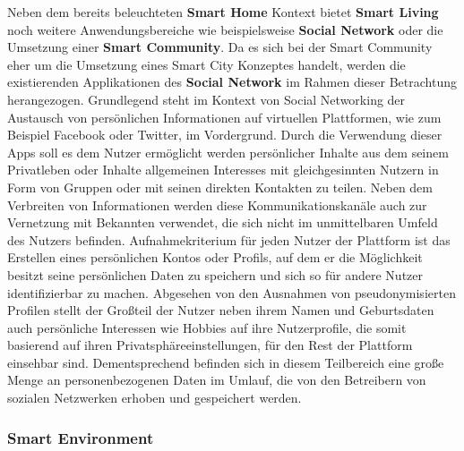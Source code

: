 Neben dem bereits beleuchteten \textbf{Smart Home} Kontext bietet \textbf{Smart Living} noch weitere Anwendungsbereiche wie beispielsweise \textbf{Social Network} oder die Umsetzung einer \textbf{Smart Community}. 
Da es sich bei der Smart Community eher um die Umsetzung eines Smart City Konzeptes handelt, werden die existierenden Applikationen des \textbf{Social Network} im Rahmen dieser Betrachtung herangezogen. Grundlegend steht im Kontext von Social Networking der Austausch von persönlichen Informationen auf virtuellen Plattformen, wie zum Beispiel Facebook oder Twitter, im Vordergrund. 
Durch die Verwendung dieser Apps soll es dem Nutzer ermöglicht werden persönlicher Inhalte aus dem seinem Privatleben oder Inhalte allgemeinen Interesses mit gleichgesinnten Nutzern in Form von Gruppen oder mit seinen direkten Kontakten zu teilen. Neben dem Verbreiten von Informationen werden diese Kommunikationskanäle auch zur Vernetzung mit Bekannten verwendet, die sich nicht im unmittelbaren Umfeld des Nutzers befinden. 
Aufnahmekriterium für jeden Nutzer der Plattform ist das Erstellen eines persönlichen Kontos oder Profils, auf dem er die Möglichkeit besitzt seine persönlichen Daten zu speichern und sich so für andere Nutzer identifizierbar zu machen. 
Abgesehen von den Ausnahmen von pseudonymisierten Profilen stellt der Großteil der Nutzer neben ihrem Namen und Geburtsdaten auch persönliche Interessen wie Hobbies auf ihre Nutzerprofile, die somit basierend auf ihren Privatsphäreeinstellungen, für den Rest der Plattform einsehbar sind. 
Dementsprechend befinden sich in diesem Teilbereich eine große Menge an personenbezogenen Daten im Umlauf, die von den Betreibern von sozialen Netzwerken erhoben und gespeichert werden.

\subsubsection{Smart Environment}
\label{sec:Analyse der Datenerhebung:ssec:Smart City:sssec:Smart Environment}

